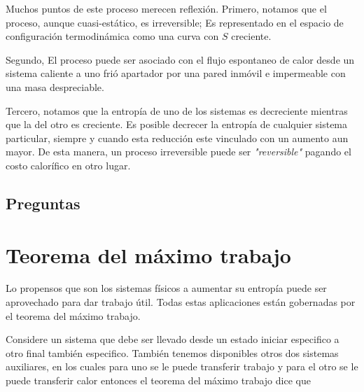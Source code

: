\documentclass{report}
\begin{document}

Muchos puntos de este proceso merecen reflexión. Primero, notamos que el proceso, aunque cuasi-estático, es irreversible; Es representado en el espacio de configuración termodinámica como una curva con $S$ creciente.

Segundo, El proceso puede ser asociado con el flujo espontaneo de calor desde un sistema caliente a uno frió apartador por una pared inmóvil e impermeable con una masa despreciable.

Tercero, notamos que la entropía de uno de los sistemas es decreciente mientras que la del otro es creciente. Es posible decrecer la entropía de cualquier sistema particular, siempre y cuando esta reducción este vinculado con un aumento aun mayor. De esta manera, un proceso irreversible puede ser \textit{"reversible"} pagando el costo calorífico en otro lugar.

\subsection{Preguntas}

\section{Teorema del máximo trabajo}\label{4.5}

Lo propensos que son los sistemas físicos a aumentar su entropía puede ser aprovechado para dar trabajo útil. Todas estas aplicaciones están gobernadas por el teorema del máximo trabajo.

Considere un sistema que debe ser llevado desde un estado iniciar especifico a otro final también especifico. También tenemos disponibles otros dos sistemas auxiliares, en los cuales para uno se le puede transferir trabajo y para el otro se le puede transferir calor entonces el teorema del máximo trabajo dice que

\end{document}
